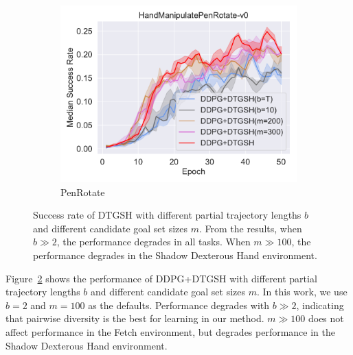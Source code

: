 \begin{figure}[h!]
\begin{subfigure}[t]{0.49\textwidth}
    \includegraphics[width=\textwidth]{figures/chapter4/HandManipulatePenRotate-v0_ab2.pdf}
    \caption{PenRotate}
    \label{subfig:baseline_handpen_ab2}
  \end{subfigure}\hfill
  \caption[Results of ablation studies of different parameters of each module.]{Success rate of DTGSH with different partial trajectory lengths $b$ and different candidate goal set sizes $m$. From the results, when $b \gg 2$, the performance degrades in all tasks. When $m \gg 100$, the performance degrades in the Shadow Dexterous Hand environment.}
  \label{fig:ablation2}
\end{figure}

Figure~\ref{fig:ablation2} shows the performance of DDPG+DTGSH with different partial trajectory lengths $b$ and different candidate goal set sizes $m$. In this work, we use $b = 2$ and $m = 100$ as the defaults. Performance degrades with $b \gg 2$, indicating that pairwise diversity is the best for learning in our method. $m \gg 100$ does not affect performance in the Fetch environment, but degrades performance in the Shadow Dexterous Hand environment.



